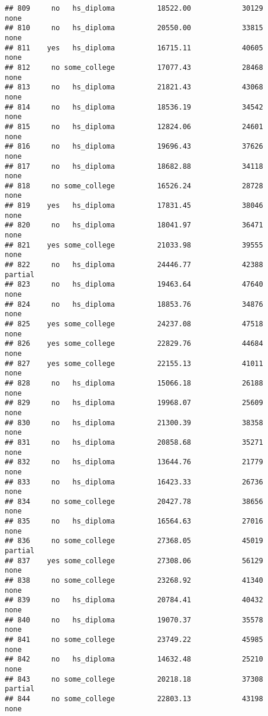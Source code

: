 \documentclass[
]{article}
\begin{document}
\begin{verbatim}
## 809     no   hs_diploma          18522.00            30129        none
## 810     no   hs_diploma          20550.00            33815        none
## 811    yes   hs_diploma          16715.11            40605        none
## 812     no some_college          17077.43            28468        none
## 813     no   hs_diploma          21821.43            43068        none
## 814     no   hs_diploma          18536.19            34542        none
## 815     no   hs_diploma          12824.06            24601        none
## 816     no   hs_diploma          19696.43            37626        none
## 817     no   hs_diploma          18682.88            34118        none
## 818     no some_college          16526.24            28728        none
## 819    yes   hs_diploma          17831.45            38046        none
## 820     no   hs_diploma          18041.97            36471        none
## 821    yes some_college          21033.98            39555        none
## 822     no   hs_diploma          24446.77            42388     partial
## 823     no   hs_diploma          19463.64            47640        none
## 824     no   hs_diploma          18853.76            34876        none
## 825    yes some_college          24237.08            47518        none
## 826    yes some_college          22829.76            44684        none
## 827    yes some_college          22155.13            41011        none
## 828     no   hs_diploma          15066.18            26188        none
## 829     no   hs_diploma          19968.07            25609        none
## 830     no   hs_diploma          21300.39            38358        none
## 831     no   hs_diploma          20858.68            35271        none
## 832     no   hs_diploma          13644.76            21779        none
## 833     no   hs_diploma          16423.33            26736        none
## 834     no some_college          20427.78            38656        none
## 835     no   hs_diploma          16564.63            27016        none
## 836     no some_college          27368.05            45019     partial
## 837    yes some_college          27308.06            56129        none
## 838     no some_college          23268.92            41340        none
## 839     no   hs_diploma          20784.41            40432        none
## 840     no   hs_diploma          19070.37            35578        none
## 841     no some_college          23749.22            45985        none
## 842     no   hs_diploma          14632.48            25210        none
## 843     no some_college          20218.18            37308     partial
## 844     no some_college          22803.13            43198        none

\end{verbatim}
\end{document}
